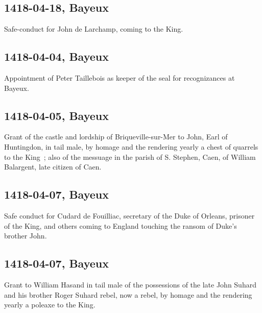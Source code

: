 \documentclass[a4paper,12pt,twoside]{book}
\begin{document}
            \subsection{1418-04-18, Bayeux}
            
                  Safe-conduct for John de Larchamp, coming to the King.
               
            \subsection{1418-04-04, Bayeux}
            
                  Appointment of Peter Taillebois as keeper of the seal for recognizances at Bayeux.
               
            \subsection{1418-04-05, Bayeux}
            
                  Grant of the castle and lordship of Briqueville-sur-Mer to John, Earl of Huntingdon, in tail male, by homage and the rendering yearly a chest of quarrels to the King ; also of the messuage in the parish of S. Stephen, Caen, of William Balargent, late citizen of Caen.
               
            \subsection{1418-04-07, Bayeux}
            
                     Safe conduct for Cudard de Fouilliac, secretary of the Duke of Orleans, prisoner of the King, and others coming to England touching the ransom of Duke's brother John.
                  
            \subsection{1418-04-07, Bayeux}
            
                     Grant to William Hasand in tail male of the possessions of the late John Suhard and his brother Roger Suhard rebel, now a rebel, by homage and the rendering yearly a poleaxe to the King.
                  
\end{document}
